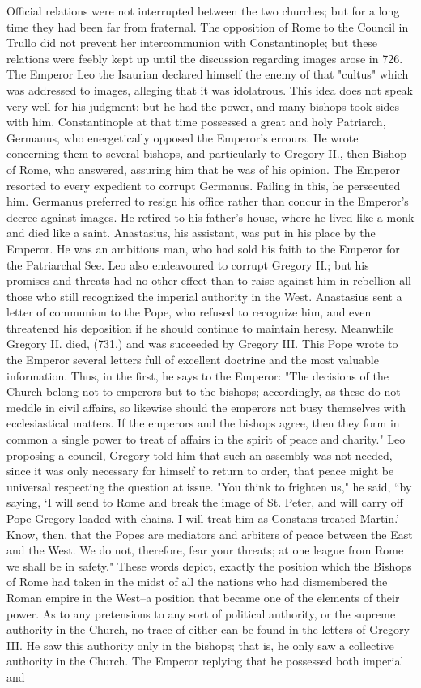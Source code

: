 Official relations were not interrupted between the two churches; but for a long time they had been far from fraternal. The opposition of Rome to the Council in Trullo did not prevent her intercommunion with Constantinople; but these relations were feebly kept up until the discussion regarding images arose in 726. The Emperor Leo the Isaurian declared himself the enemy of that "cultus" which was addressed to images, alleging that it was idolatrous. This idea does not speak very well for his judgment; but he had the power, and many bishops took sides with him. Constantinople at that time possessed a great and holy Patriarch, Germanus, who energetically opposed the Emperor's errours. He wrote concerning them to several bishops, and particularly to Gregory II., then Bishop of Rome, who answered, assuring him that he was of his opinion. The Emperor resorted to every expedient to corrupt Germanus. Failing in this, he persecuted him. Germanus preferred to resign his office rather than concur in the Emperor's decree against images. He retired to his father's house, where he lived like a monk and died like a saint. Anastasius, his assistant, was put in his place by the Emperor. He was an ambitious man, who had sold his faith to the Emperor for the Patriarchal See. Leo also endeavoured to corrupt Gregory II.; but his promises and threats had no other effect than to raise against him in rebellion all those who still recognized the imperial authority in the West. Anastasius sent a letter of communion to the Pope, who refused to recognize him, and even threatened his deposition if he should continue to maintain heresy. Meanwhile Gregory II. died, (731,) and was succeeded by Gregory III. This Pope wrote to the Emperor several letters full of excellent doctrine and the most valuable information. Thus, in the first, he says to the Emperor: "The decisions of the Church belong not to emperors but to the bishops; accordingly, as these do not meddle in civil affairs, so likewise should the emperors not busy themselves with ecclesiastical matters. If the emperors and the bishops agree, then they form in common a single power to treat of affairs in the spirit of peace and charity." Leo proposing a council, Gregory told him that such an assembly was not needed, since it was only necessary for himself to return to order, that peace might be universal respecting the question at issue. "You think to frighten us," he said, “by saying, ‘I will send to Rome and break the image of St. Peter, and will carry off Pope Gregory loaded with chains. I will treat him as Constans treated Martin.' Know, then, that the Popes are mediators and arbiters of peace between the East and the West. We do not, therefore, fear your threats; at one league from Rome we shall be in safety." These words depict, exactly the position which the Bishops of Rome had taken in the midst of all the nations who had dismembered the Roman empire in the West--a position that became one of the elements of their power. As to any pretensions to any sort of political authority, or the supreme authority in the Church, no trace of either can be found in the letters of Gregory III. He saw this authority only in the bishops; that is, he only saw a collective authority in the Church. The Emperor replying that he possessed both imperial and 